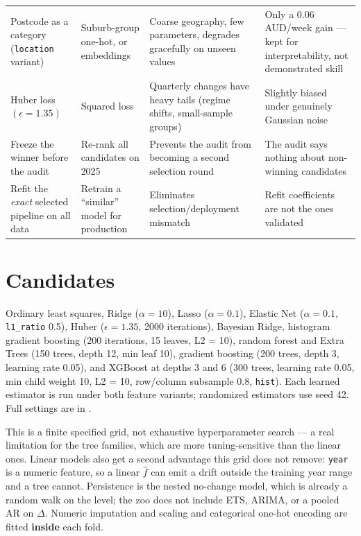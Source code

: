 \documentclass[11pt,a4paper]{article}
\begin{document}
\begin{center}
\begin{tabularx}{\linewidth}{@{}>{\raggedright\arraybackslash}X>{\raggedright\arraybackslash}X>{\raggedright\arraybackslash}X>{\raggedright\arraybackslash}X@{}}
Postcode as a category (\texttt{location} variant) & Suburb-group one-hot, or embeddings & Coarse geography, few parameters, degrades gracefully on unseen values & Only a 0.06 AUD/week gain --- kept for interpretability, not demonstrated skill \\
Huber loss \((\epsilon = 1.35)\) & Squared loss & Quarterly changes have heavy tails (regime shifts, small-sample groups) & Slightly biased under genuinely Gaussian noise \\
Freeze the winner before the audit & Re-rank all candidates on 2025 & Prevents the audit from becoming a second selection round & The audit says nothing about non-winning candidates \\
Refit the \emph{exact} selected pipeline on all data & Retrain a ``similar'' model for production & Eliminates selection/deployment mismatch & Refit coefficients are not the ones validated \\
\bottomrule
\end{tabularx}
\end{center}

\section{Candidates}

Ordinary least squares, Ridge (\(\alpha = 10\)), Lasso (\(\alpha = 0.1\)), Elastic Net (\(\alpha = 0.1\), \texttt{l1\_ratio} 0.5), Huber (\(\epsilon = 1.35\), 2000 iterations), Bayesian Ridge, histogram gradient boosting (200 iterations, 15 leaves, L2 = 10), random forest and Extra Trees (150 trees, depth 12, min leaf 10), gradient boosting (200 trees, depth 3, learning rate 0.05), and XGBoost at depths 3 and 6 (300 trees, learning rate 0.05, min child weight 10, L2 = 10, row/column subsample 0.8, \texttt{hist}). Each learned estimator is run under both feature variants; randomized estimators use seed 42. Full settings are in .

This is a finite specified grid, not exhaustive hyperparameter search --- a real limitation for the tree families, which are more tuning-sensitive than the linear ones. Linear models also get a second advantage this grid does not remove: \texttt{year} is a numeric feature, so a linear \(\hat f\) can emit a drift outside the training year range and a tree cannot. Persistence is the nested no-change model, which is already a random walk on the level; the zoo does not include ETS, ARIMA, or a pooled AR on \(\Delta\). Numeric imputation and scaling and categorical one-hot encoding are fitted \textbf{inside} each fold.
\end{document}
